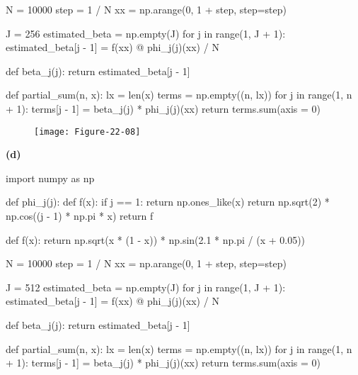 \begin{python}
N = 10000
step = 1 / N
xx = np.arange(0, 1 + step, step=step)

J = 256
estimated_beta = np.empty(J)
for j in range(1, J + 1):
    estimated_beta[j - 1] = f(xx) @ phi_{j}(j)(xx) / N
    
def beta_{j}(j):
    return estimated_beta[j - 1]

def partial_sum(n, x):
    lx = len(x)
    terms = np.empty((n, lx))
    for j in range(1, n + 1):
        terms[j - 1] = beta_{j}(j) * phi_{j}(j)(xx)
    return terms.sum(axis = 0)
\end{python}


\begin{figure}[H]
\centering
\texttt{[image: Figure-22-08]}
\end{figure}

\textbf{(d)}

\begin{python}
import numpy as np

def phi_{j}(j):
    def f(x):
        if j == 1:
            return np.ones_like(x)
        return np.sqrt(2) * np.cos((j - 1) * np.pi * x)
    return f

def f(x):
    return np.sqrt(x * (1 - x)) * np.sin(2.1 * np.pi / (x + 0.05))
\end{python}

\begin{python}
N = 10000
step = 1 / N
xx = np.arange(0, 1 + step, step=step)

J = 512
estimated_beta = np.empty(J)
for j in range(1, J + 1):
    estimated_beta[j - 1] = f(xx) @ phi_{j}(j)(xx) / N
    
def beta_{j}(j):
    return estimated_beta[j - 1]

def partial_sum(n, x):
    lx = len(x)
    terms = np.empty((n, lx))
    for j in range(1, n + 1):
        terms[j - 1] = beta_{j}(j) * phi_{j}(j)(xx)
    return terms.sum(axis = 0)
\end{python}

